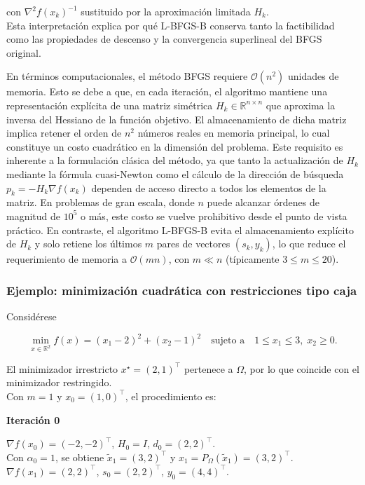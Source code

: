 \documentclass[
  spanish,
  us-letterpaper,
  DIV=11,
  numbers=noendperiod]{scrreprt}
\numberwithin{equation}{section}
\begin{document}
con \(\nabla^2 f(x_k)^{-1}\) sustituido por la aproximación limitada
\(H_k\).\\
Esta interpretación explica por qué L-BFGS-B conserva tanto la
factibilidad como las propiedades de descenso y la convergencia
superlineal del BFGS original.

En términos computacionales, el método BFGS requiere
\(\mathcal{O}(n^2)\) unidades de memoria. Esto se debe a que, en cada
iteración, el algoritmo mantiene una representación explícita de una
matriz simétrica \(H_k \in \mathbb{R}^{n \times n}\) que aproxima la
inversa del Hessiano de la función objetivo. El almacenamiento de dicha
matriz implica retener el orden de \(n^2\) números reales en memoria
principal, lo cual constituye un costo cuadrático en la dimensión del
problema. Este requisito es inherente a la formulación clásica del
método, ya que tanto la actualización de \(H_k\) mediante la fórmula
cuasi-Newton como el cálculo de la dirección de búsqueda
\(p_k = -H_k \nabla f(x_k)\) dependen de acceso directo a todos los
elementos de la matriz. En problemas de gran escala, donde \(n\) puede
alcanzar órdenes de magnitud de \(10^5\) o más, este costo se vuelve
prohibitivo desde el punto de vista práctico. En contraste, el algoritmo
L-BFGS-B evita el almacenamiento explícito de \(H_k\) y solo retiene los
últimos \(m\) pares de vectores \((s_k, y_k)\), lo que reduce el
requerimiento de memoria a \(\mathcal{O}(mn)\), con \(m \ll n\)
(típicamente \(3 \leq m \leq 20\)).

\subsubsection{Ejemplo: minimización cuadrática con restricciones tipo
caja}\label{ejemplo-minimizaciuxf3n-cuadruxe1tica-con-restricciones-tipo-caja}

Considérese

\[
\min_{x \in \mathbb{R}^2} f(x) = (x_1 - 2)^2 + (x_2 - 1)^2
\quad \text{sujeto a} \quad 1 \le x_1 \le 3, \; x_2 \ge 0.
\]

El minimizador irrestricto \(x^\star = (2,1)^\top\) pertenece a
\(\Omega\), por lo que coincide con el minimizador restringido.\\
Con \(m=1\) y \(x_0=(1,0)^\top\), el procedimiento es:

\textbf{Iteración 0}

\(\nabla f(x_0)=(-2,-2)^\top\), \(H_0=I\), \(d_0=(2,2)^\top\).\\
Con \(\alpha_0=1\), se obtiene \(\tilde{x}_1=(3,2)^\top\) y
\(x_1=P_\Omega(\tilde{x}_1)=(3,2)^\top\).\\
\(\nabla f(x_1)=(2,2)^\top\), \(s_0=(2,2)^\top\), \(y_0=(4,4)^\top\).
\end{document}
